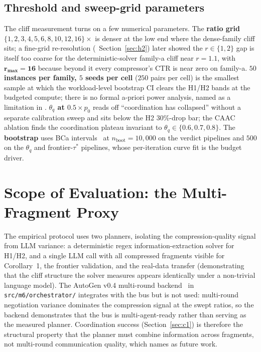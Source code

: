 \subsection{Threshold and sweep-grid parameters}
\label{sec:design_thresholds}

The cliff measurement turns on a few numerical parameters. The
\textbf{ratio grid} $\{1,2,3,4,5,6,8,10,12,16\}\times$ is denser at
the low end where the dense-family cliff sits; a fine-grid
re-resolution (~Section~\ref{sec:h2}) later
showed the $r\in\{1,2\}$ gap is itself too coarse for the
deterministic-solver family-a cliff near $r=1.1$, with
$\mathbf{r_{\max}=16}$ because beyond it every compressor's CTR is
near zero on family-a. \textbf{$50$ instances per family, $5$ seeds
per cell} ($250$ pairs per cell) is the smallest sample at which the
workload-level bootstrap CI clears the H1/H2 bands at the budgeted
compute; there is no formal a-priori power analysis, named as a
limitation in . \textbf{$\theta_q$ at
$0.5\times p_0$} reads off ``coordination has collapsed'' without a
separate calibration sweep and sits below the H2 $30\%$-drop bar; the
CAAC ablation finds the coordination plateau invariant to
$\theta_q\in\{0.6,0.7,0.8\}$. The \textbf{bootstrap} uses BCa
intervals~\cite{efron1993bootstrap} at $n_\text{boot}=10{,}000$ on
the verdict pipelines and $500$ on the $\theta_q$ and
frontier-$\tau^{*}$ pipelines, whose per-iteration curve fit is the
budget driver.


\section{Scope of Evaluation: the Multi-Fragment Proxy}
\label{sec:scope}

The empirical protocol uses two planners, isolating the
compression-quality signal from LLM variance: a deterministic regex
information-extraction solver for H1/H2, and a single LLM call with
all compressed fragments visible for Corollary~1, the frontier
validation, and the real-data transfer (demonstrating that the cliff
structure the solver measures appears identically under a non-trivial
language model). The AutoGen v0.4 multi-round
backend~\cite{wu2023autogen} in \texttt{src/m6/orchestrator/}
integrates with the bus but is not used: multi-round negotiation
variance dominates the compression signal at the swept ratios, so the
backend demonstrates that the bus is multi-agent-ready rather than
serving as the measured planner. Coordination success
(Section~\ref{sec:c1}) is therefore the structural property that the
planner must combine information across fragments, not multi-round
communication quality, which  names as future work.

